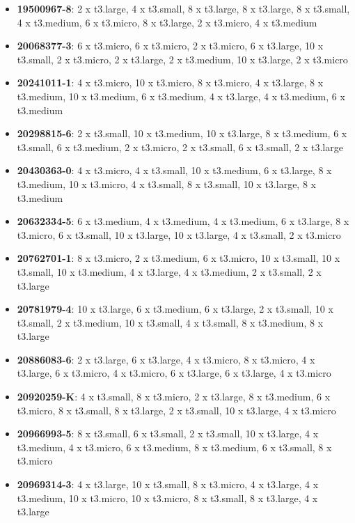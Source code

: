 \documentclass[12pt,letterpaper,twoside]{article}
\begin{document}
{    \begin{itemize}
        \item \textbf{19500967-8}: 2 x t3.large, 4 x t3.small, 8 x t3.large, 8 x t3.large, 8 x t3.small, 4 x t3.medium, 6 x t3.micro, 8 x t3.large, 2 x t3.micro, 4 x t3.medium
        \item \textbf{20068377-3}: 6 x t3.micro, 6 x t3.micro, 2 x t3.micro, 6 x t3.large, 10 x t3.small, 2 x t3.micro, 2 x t3.large, 2 x t3.medium, 10 x t3.large, 2 x t3.micro
        \item \textbf{20241011-1}: 4 x t3.micro, 10 x t3.micro, 8 x t3.micro, 4 x t3.large, 8 x t3.medium, 10 x t3.medium, 6 x t3.medium, 4 x t3.large, 4 x t3.medium, 6 x t3.medium
        \item \textbf{20298815-6}: 2 x t3.small, 10 x t3.medium, 10 x t3.large, 8 x t3.medium, 6 x t3.small, 6 x t3.medium, 2 x t3.micro, 2 x t3.small, 6 x t3.small, 2 x t3.large
        \item \textbf{20430363-0}: 4 x t3.micro, 4 x t3.small, 10 x t3.medium, 6 x t3.large, 8 x t3.medium, 10 x t3.micro, 4 x t3.small, 8 x t3.small, 10 x t3.large, 8 x t3.medium
        \item \textbf{20632334-5}: 6 x t3.medium, 4 x t3.medium, 4 x t3.medium, 6 x t3.large, 8 x t3.micro, 6 x t3.small, 10 x t3.large, 10 x t3.large, 4 x t3.small, 2 x t3.micro
        \item \textbf{20762701-1}: 8 x t3.micro, 2 x t3.medium, 6 x t3.micro, 10 x t3.small, 10 x t3.small, 10 x t3.medium, 4 x t3.large, 4 x t3.medium, 2 x t3.small, 2 x t3.large
        \item \textbf{20781979-4}: 10 x t3.large, 6 x t3.medium, 6 x t3.large, 2 x t3.small, 10 x t3.small, 2 x t3.medium, 10 x t3.small, 4 x t3.small, 8 x t3.medium, 8 x t3.large
        \item \textbf{20886083-6}: 2 x t3.large, 6 x t3.large, 4 x t3.micro, 8 x t3.micro, 4 x t3.large, 6 x t3.micro, 4 x t3.micro, 6 x t3.large, 6 x t3.large, 4 x t3.micro
        \item \textbf{20920259-K}: 4 x t3.small, 8 x t3.micro, 2 x t3.large, 8 x t3.medium, 6 x t3.micro, 8 x t3.small, 8 x t3.large, 2 x t3.small, 10 x t3.large, 4 x t3.micro
        \item \textbf{20966993-5}: 8 x t3.small, 6 x t3.small, 2 x t3.small, 10 x t3.large, 4 x t3.medium, 4 x t3.micro, 6 x t3.medium, 8 x t3.medium, 6 x t3.small, 8 x t3.micro
        \item \textbf{20969314-3}: 4 x t3.large, 10 x t3.small, 8 x t3.micro, 4 x t3.large, 4 x t3.medium, 10 x t3.micro, 10 x t3.micro, 8 x t3.small, 8 x t3.large, 4 x t3.large

\end{itemize}}
\end{document}
